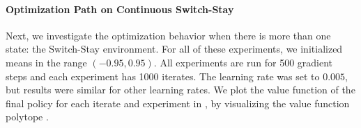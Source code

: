 \documentclass{article}
\begin{document}
\paragraph{Optimization Path on Continuous Switch-Stay}
Next, we investigate the optimization behavior when there is more than one state: the Switch-Stay environment. %
For all of these experiments, we initialized means in the range $(-0.95, 0.95)$. All experiments are run for 500 gradient steps and each experiment has 1000 iterates. The learning rate was set to $0.005$, but results were similar for other learning rates. We plot the value function of the final policy for each iterate and experiment in , by visualizing the value function polytope \citep{dadashi2019value}. 
\end{document}
